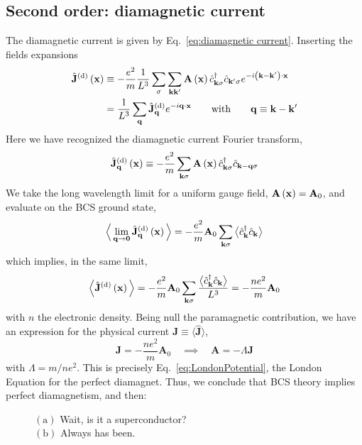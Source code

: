 \subsection{Second order: diamagnetic current}

The diamagnetic current is given by Eq.~\eqref{eq:diamagnetic current}. Inserting the fields expansions
\[
\begin{aligned}
	\hat{\mathbf{J}}^{(\mathrm{d})} \lrR{\mathbf{x}} &\equiv - \frac{e^2}{m} \frac{1}{L^3} \sum_\sigma \sum_{\mathbf{k}\mathbf{k}'}
		\mathbf{A}\lrR{\mathbf{x}}
		\hat{c}_{\mathbf{k}\sigma}^\dagger \hat{c}_{\mathbf{k}'\sigma}
		e^{-i\lrR{\mathbf{k}-\mathbf{k}'} \cdot \mathbf{x}} \\
	&= \frac{1}{L^3} \sum_\mathbf{q}
	\hat{\mathbf{J}}^{(\mathrm{d})}_\mathbf{q} e^{- i \mathbf{q} \cdot \mathbf{x}} \quad\qq{with}\quad
	\mathbf{q} \equiv \mathbf{k} - \mathbf{k}'
\end{aligned}
\]
Here we have recognized the diamagnetic current Fourier transform,
\[
	\hat{\mathbf{J}}^{(\mathrm{d})}_\mathbf{q} \left({\mathbf{x}}\right) \equiv - \frac{e^2}{m} \sum_{\mathbf{k}\sigma} \mathbf{A}\left({\mathbf{x}}\right)
	\hat{c}_{\mathbf{k}\sigma}^\dagger \hat{c}_{\mathbf{k}-\mathbf{q}\sigma}
\]
We take the long wavelength limit for a uniform gauge field, $\mathbf{A}\left({\mathbf{x}}\right) = \mathbf{A}_0$, and evaluate on the BCS ground state,
\[
	\Big\langle
		\lim_{\mathbf{q}\to\mathbf{0}} \hat{\mathbf{J}}^{(\mathrm{d})}_\mathbf{q} \left({\mathbf{x}}\right)
	\Big\rangle = - \frac{e^2}{m} \mathbf{A}_0 \sum_{\mathbf{k}\sigma} \big\langle\hat{c}_\mathbf{k}^\dagger \hat{c}_\mathbf{k}\big\rangle 
\]
which implies, in the same limit,
\[
	\Big\langle \hat{\mathbf{J}}^{(\mathrm{d})} \left({\mathbf{x}}\right) \Big\rangle = - \frac{e^2}{m} \mathbf{A}_0 \sum_{\mathbf{k}\sigma} \frac{\big\langle\hat{c}_\mathbf{k}^\dagger \hat{c}_\mathbf{k}\big\rangle}{L^3} = - \frac{n e^2}{m} \mathbf{A}_0
\]
with $n$ the electronic density. Being null the paramagnetic contribution, we have an expression for the physical current $\mathbf{J} \equiv \big\langle \hat{\mathbf{J}} \big\rangle$,
\[
	\mathbf{J} = - \frac{n e^2}{m} \mathbf{A}_0
	\quad\implies\quad
	\mathbf{A} = - \Lambda \mathbf{J}
\]
with $\Lambda = m/ne^2$. This is precisely Eq.~\eqref{eq:LondonPotential}, the London Equation for the perfect diamagnet. Thus, we conclude that BCS theory implies perfect diamagnetism, and then:
\begin{figure}[htbp!]
	\centering
	
	\caption[$(\mathrm{a})$ Wait, is it a superconductor?; $(\mathrm{b})$ Always has been.]
	{$(\mathrm{a})$ Wait, is it a superconductor? \\ $(\mathrm{b})$ Always has been.\endtabular}
	\label{fig:always}
\end{figure}